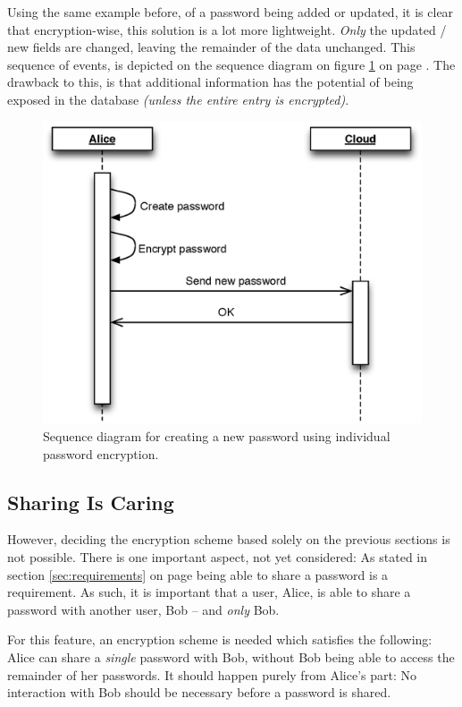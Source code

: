 			Using the same example before, of a password being added or updated, it is clear that encryption-wise, this solution is a lot more lightweight. \emph{Only} the updated / new fields are changed, leaving the remainder of the data unchanged. This sequence of events, is depicted on the sequence diagram on figure \ref{fig:seq_perentry} on page \pageref{fig:seq_perentry}. The drawback to this, is that additional information has the potential of being exposed in the database \emph{(unless the entire entry is encrypted)}.


			\begin{figure}[h!]
				\centering
				\includegraphics[width=\textwidth]{figures/design/uml/sequence/individual.eps}
				\caption{Sequence diagram for creating a new password using individual password encryption.}
				\label{fig:seq_perentry}
			\end{figure}

		\subsection{Sharing Is Caring}
			\label{sec:share}
			However, deciding the encryption scheme based solely on the previous sections is not possible. There is one important aspect, not yet considered: As stated in section \ref{sec:requirements} on page \pageref{sec:requirements} being able to share a password is a requirement. As such, it is important that a user, Alice, is able to share a password with another user, Bob -- and \emph{only} Bob.

			For this feature, an encryption scheme is needed which satisfies the following: Alice can share a \emph{single} password with Bob, without Bob being able to access the remainder of her passwords. It should happen purely from Alice's part: No interaction with Bob should be necessary before a password is shared.


